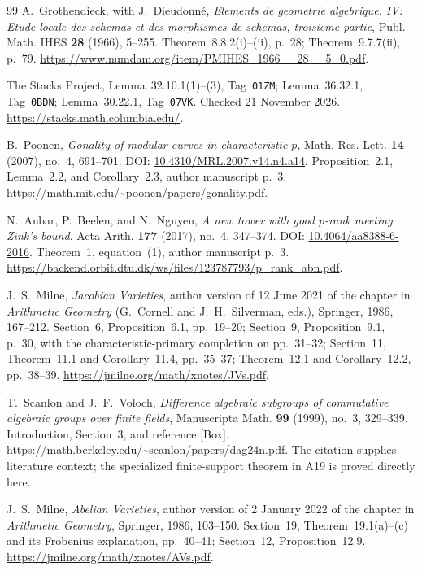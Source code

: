 \documentclass[11pt,a4paper]{article}
\begin{document}
\begin{thebibliography}{99}
A.~Grothendieck, with J.~Dieudonn\'e, \emph{Elements de geometrie
algebrique. IV: Etude locale des schemas et des morphismes de
schemas, troisieme partie}, Publ. Math. IHES \textbf{28} (1966),
5--255. Theorem~8.8.2(i)--(ii), p.~28; Theorem~9.7.7(ii), p.~79.
\url{https://www.numdam.org/item/PMIHES_1966__28__5_0.pdf}.

The Stacks Project, Lemma~32.10.1(1)--(3), Tag~\texttt{01ZM};
Lemma~36.32.1, Tag~\texttt{0BDN}; Lemma~30.22.1,
Tag~\texttt{07VK}. Checked 21 November 2026.
\url{https://stacks.math.columbia.edu/}.

B.~Poonen,
\emph{Gonality of modular curves in characteristic $p$},
Math. Res. Lett. \textbf{14} (2007), no.~4, 691--701.
DOI: \href{https://doi.org/10.4310/MRL.2007.v14.n4.a14}{10.4310/MRL.2007.v14.n4.a14}.
Proposition~2.1, Lemma~2.2, and Corollary~2.3, author manuscript p.~3.
\url{https://math.mit.edu/~poonen/papers/gonality.pdf}.

N.~Anbar, P.~Beelen, and N.~Nguyen,
\emph{A new tower with good $p$-rank meeting Zink's bound},
Acta Arith. \textbf{177} (2017), no.~4, 347--374.
DOI: \href{https://doi.org/10.4064/aa8388-6-2016}{10.4064/aa8388-6-2016}.
Theorem~1, equation~(1), author manuscript p.~3.
\url{https://backend.orbit.dtu.dk/ws/files/123787793/p_rank_abn.pdf}.

J.~S.~Milne, \emph{Jacobian Varieties}, author version of
12 June 2021 of the chapter in \emph{Arithmetic Geometry}
(G.~Cornell and J.~H.~Silverman, eds.), Springer, 1986, 167--212.
Section~6, Proposition~6.1, pp.~19--20;
Section~9, Proposition~9.1, p.~30, with the characteristic-primary
completion on pp.~31--32; Section~11, Theorem~11.1 and
Corollary~11.4, pp.~35--37;
Theorem~12.1 and Corollary~12.2, pp.~38--39.
\url{https://jmilne.org/math/xnotes/JVs.pdf}.

T.~Scanlon and J.~F.~Voloch,
\emph{Difference algebraic subgroups of commutative algebraic
groups over finite fields},
Manuscripta Math. \textbf{99} (1999), no.~3, 329--339.
Introduction, Section~3, and reference \textnormal{[Box]}.
\url{https://math.berkeley.edu/~scanlon/papers/dag24n.pdf}.
The citation supplies literature context; the specialized
finite-support theorem in A19 is proved directly here.


J.~S.~Milne, \emph{Abelian Varieties}, author version of
2 January 2022 of the chapter in \emph{Arithmetic Geometry},
Springer, 1986, 103--150.
Section~19, Theorem~19.1(a)--(c) and its Frobenius explanation,
pp.~40--41; Section~12, Proposition~12.9.
\url{https://jmilne.org/math/xnotes/AVs.pdf}.



\end{thebibliography}
\end{document}
